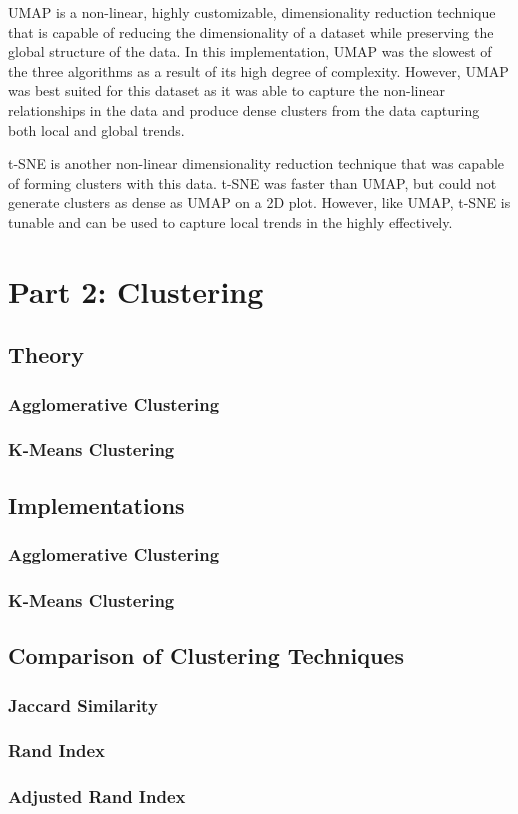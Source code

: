 \documentclass[12pt]{article}
\begin{document}
\begin{enumerate}
    UMAP is a non-linear, highly customizable, dimensionality reduction technique that is capable of reducing the dimensionality of a dataset while preserving the global structure of the data. In this implementation, UMAP was the slowest of the three algorithms as a result of its high degree of complexity. However, UMAP was best suited for this dataset as it was able to capture the non-linear relationships in the data and produce dense clusters from the data capturing both local and global trends.

    t-SNE is another non-linear dimensionality reduction technique that was capable of forming clusters with this data. t-SNE was faster than UMAP, but could not generate clusters as dense as UMAP on a 2D plot. However, like UMAP, t-SNE is tunable and can be used to capture local trends in the  highly effectively.
\end{enumerate}

\section{Part 2: Clustering}
\subsection{Theory}
\subsubsection{Agglomerative Clustering}

\subsubsection{K-Means Clustering}

\subsection{Implementations}
\subsubsection{Agglomerative Clustering}

\subsubsection{K-Means Clustering}

\subsection{Comparison of Clustering Techniques}
\subsubsection{Jaccard Similarity}

\subsubsection{Rand Index}

\subsubsection{Adjusted Rand Index}

\newpage



\end{document}
